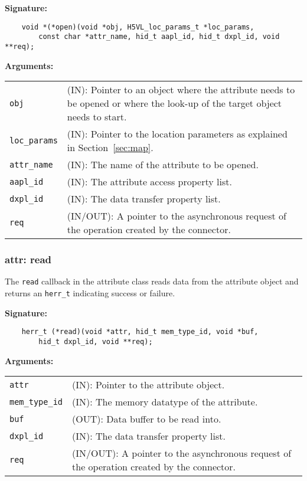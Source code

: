 \begin{mdframed}[style=bgbox]
\textbf{Signature:}
\begin{lstlisting}
    void *(*open)(void *obj, H5VL_loc_params_t *loc_params, 
        const char *attr_name, hid_t aapl_id, hid_t dxpl_id, void **req);
\end{lstlisting}

\textbf{Arguments:}\\
\begin{tabular}{l p{13.5cm}}
  \texttt{obj} & (IN): Pointer to an object where the attribute needs to be
  opened or where the look-up of the target object needs to start.\\
  \texttt{loc\_params} & (IN): Pointer to the location parameters as explained in
  Section~\ref{sec:map}.\\
  \texttt{attr\_name} & (IN): The name of the attribute to be opened.\\
  \texttt{aapl\_id} & (IN): The attribute access property list.\\
  \texttt{dxpl\_id} & (IN): The data transfer property list.\\
  \texttt{req} & (IN/OUT): A pointer to the asynchronous request of the
  operation created by the connector.\\
\end{tabular}
\end{mdframed}

\subsubsection{attr: read}
The \texttt{read} callback in the attribute class reads data from
the attribute object and returns an \texttt{herr\_t} indicating success or
failure.\bigskip

\begin{mdframed}[style=bgbox]
\textbf{Signature:}
\begin{lstlisting}
    herr_t (*read)(void *attr, hid_t mem_type_id, void *buf, 
        hid_t dxpl_id, void **req);
\end{lstlisting}

\textbf{Arguments:}\\
\begin{tabular}{l p{13.5cm}}
  \texttt{attr} & (IN): Pointer to the attribute object.\\
  \texttt{mem\_type\_id} & (IN): The memory datatype of the attribute.\\
  \texttt{buf} & (OUT): Data buffer to be read into.\\
  \texttt{dxpl\_id} & (IN): The data transfer property list.\\
  \texttt{req} & (IN/OUT): A pointer to the asynchronous request of the
  operation created by the connector.\\
\end{tabular}
\end{mdframed}

